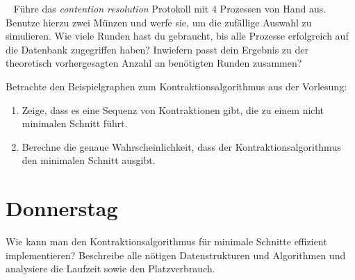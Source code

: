 \documentclass{uebung_cs}
\begin{document}
\begin{exercise}\
	Führe das \textit{contention resolution} Protokoll mit $4$ Prozessen von Hand aus. Benutze hierzu zwei Münzen und werfe sie, um die zufällige Auswahl zu simulieren.
	Wie viele Runden hast du gebraucht, bis alle Prozesse erfolgreich auf die Datenbank zugegriffen haben?
	Inwiefern passt dein Ergebnis zu der theoretisch vorhergesagten Anzahl an benötigten Runden zusammen?
\end{exercise}    

\begin{exercise}[Minimaler Schnitt]
	Betrachte den Beispielgraphen zum Kontraktionsalgorithmus aus der Vorlesung:
	\begin{center}
	\end{center}
	\begin{enumerate}
		\item Zeige, dass es eine Sequenz von Kontraktionen gibt, die zu einem nicht minimalen Schnitt führt.
		\item Berechne die genaue Wahrscheinlichkeit, dass der Kontraktionsalgorithmus den minimalen Schnitt ausgibt.
	\end{enumerate}
\end{exercise}

\section*{Donnerstag}

\begin{exercise}
	Wie kann man den Kontraktionsalgorithmus für minimale Schnitte effizient implementieren? Beschreibe alle nötigen Datenstrukturen und Algorithmen und analysiere die Laufzeit sowie den Platzverbrauch.
\end{exercise}
\end{document}
